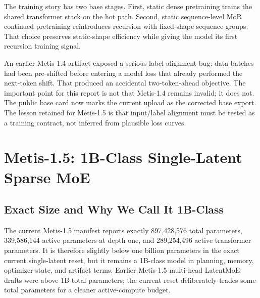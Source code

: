 \documentclass[11pt]{article}
\begin{document}
The training story has two base stages. First, static dense pretraining trains
the shared transformer stack on the hot path. Second, static sequence-level MoR
continued pretraining reintroduces recursion with fixed-shape sequence groups.
That choice preserves static-shape efficiency while giving the model its first
recursion training signal.

An earlier Metis-1.4 artifact exposed a serious label-alignment bug: data
batches had been pre-shifted before entering a model loss that already performed
the next-token shift. That produced an accidental two-token-ahead objective. The
important point for this report is not that Metis-1.4 remains invalid; it does
not. The public base card now marks the current upload as the corrected base
export. The lesson retained for Metis-1.5 is that input/label alignment must be
tested as a training contract, not inferred from plausible loss curves.

\section{Metis-1.5: 1B-Class Single-Latent Sparse MoE}

\subsection{Exact Size and Why We Call It 1B-Class}

The current Metis-1.5 manifest reports exactly 897,428,576 total parameters,
339,586,144 active parameters at depth one, and 289,254,496 active transformer
parameters. It is therefore slightly below one billion parameters in the exact
current single-latent reset, but it remains a 1B-class model in planning,
memory, optimizer-state, and artifact terms. Earlier Metis-1.5 multi-head
LatentMoE drafts were above 1B total parameters; the current reset deliberately
trades some total parameters for a cleaner active-compute budget.
\end{document}
